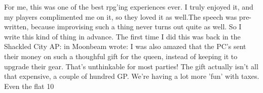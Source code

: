 For me, this was one of the best rpg'ing experiences ever. I truly enjoyed it, and my players complimented me on it, so they loved it as well.The speech was pre-written, because improvising such a thing never turns out quite as well. So I write this kind of thing in advance. The first time I did this was back in the Shackled City AP: in Moonbeam wrote: I was also amazed that the PC's sent their money on such a thoughful gift for the queen, instead of keeping it to upgrade their gear. That's unthinkable for most parties! The gift actually isn't all that expensive, a couple of hundred GP. We're having a lot more 'fun' with taxes. Even the flat 10 %